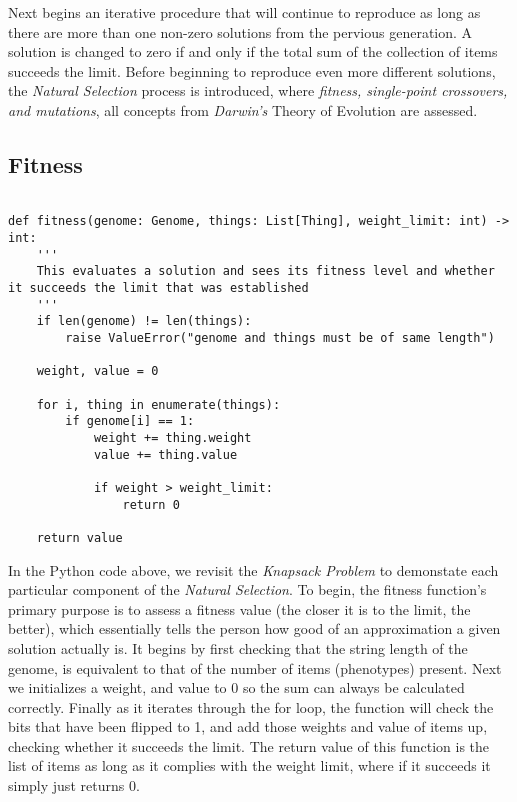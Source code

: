Next begins an iterative procedure that will continue to reproduce as long as there are more than one non-zero solutions from the pervious generation. A solution is changed to zero if and only if the total sum of the collection of items succeeds the limit. Before beginning to reproduce even more different solutions, the \emph{Natural Selection} process is introduced, where \emph{fitness, single-point crossovers, and mutations}, all concepts from \emph{Darwin's} Theory of Evolution are assessed. 

\subsection{Fitness}

\begin{lstlisting}

def fitness(genome: Genome, things: List[Thing], weight_limit: int) -> int:
    '''
    This evaluates a solution and sees its fitness level and whether it succeeds the limit that was established
    '''
    if len(genome) != len(things):
        raise ValueError("genome and things must be of same length")

    weight, value = 0

    for i, thing in enumerate(things):
        if genome[i] == 1:
            weight += thing.weight
            value += thing.value

            if weight > weight_limit:
                return 0
    
    return value

\end{lstlisting}

In the Python code above, we revisit the \emph{Knapsack Problem} to demonstate each particular component of the \emph{Natural Selection}. To begin, the fitness function's primary purpose is to assess a fitness value (the closer it is to the limit, the better), which essentially tells the person how good of an approximation a given solution actually is. It begins by first checking that the string length of the genome, is equivalent to that of the number of items (phenotypes) present. Next we initializes a weight, and value to 0 so the sum can always be calculated correctly. Finally as it iterates through the for loop, the function  will check the bits that have been flipped to 1, and add those weights and value of items up, checking whether it succeeds the limit. The return value of this function is the list of items as long as it complies with the weight limit, where if it succeeds it simply just returns 0.   

